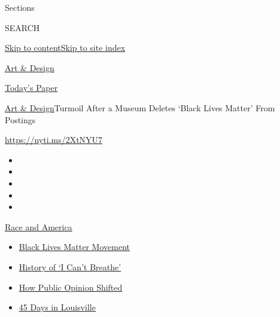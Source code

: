 Sections

SEARCH

\protect\hyperlink{site-content}{Skip to
content}\protect\hyperlink{site-index}{Skip to site index}

\href{https://www.nytimes3xbfgragh.onion/section/arts/design}{Art \&
Design}

\href{https://myaccount.nytimes3xbfgragh.onion/auth/login?response_type=cookie\&client_id=vi}{}

\href{https://www.nytimes3xbfgragh.onion/section/todayspaper}{Today's
Paper}

\href{/section/arts/design}{Art \& Design}\textbar{}Turmoil After a
Museum Deletes `Black Lives Matter' From Postings

\url{https://nyti.ms/2XtNYU7}

\begin{itemize}
\item
\item
\item
\item
\item
\end{itemize}

\href{https://www.nytimes3xbfgragh.onion/news-event/george-floyd-protests-minneapolis-new-york-los-angeles?action=click\&pgtype=Article\&state=default\&region=TOP_BANNER\&context=storylines_menu}{Race
and America}

\begin{itemize}
\tightlist
\item
  \href{https://www.nytimes3xbfgragh.onion/interactive/2020/07/03/us/george-floyd-protests-crowd-size.html?action=click\&pgtype=Article\&state=default\&region=TOP_BANNER\&context=storylines_menu}{Black
  Lives Matter Movement}
\item
  \href{https://www.nytimes3xbfgragh.onion/interactive/2020/06/28/us/i-cant-breathe-police-arrest.html?action=click\&pgtype=Article\&state=default\&region=TOP_BANNER\&context=storylines_menu}{History
  of `I Can't Breathe'}
\item
  \href{https://www.nytimes3xbfgragh.onion/interactive/2020/06/10/upshot/black-lives-matter-attitudes.html?action=click\&pgtype=Article\&state=default\&region=TOP_BANNER\&context=storylines_menu}{How
  Public Opinion Shifted}
\item
  \href{https://www.nytimes3xbfgragh.onion/interactive/2020/07/16/us/black-lives-matter-protests-louisville-breonna-taylor.html?action=click\&pgtype=Article\&state=default\&region=TOP_BANNER\&context=storylines_menu}{45
  Days in Louisville}
\end{itemize}

